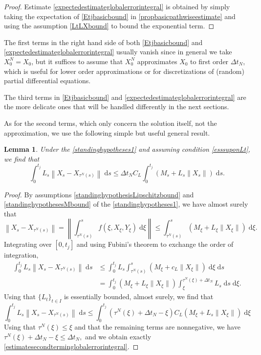 \documentclass[reqno,12pt]{amsart}
\theoremstyle{plain} %
\newtheorem{lemma}{Lemma}[section]
\theoremstyle{definition} %
\begin{document}
\begin{proof}
    Estimate \eqref{expectedestimateglobalerrorintegral} is obtained by simply taking the expectation of \eqref{Etjbasicbound} in \cref{propbasicpathwiseestimate} and using the assumption \eqref{LtLXbound} to bound the exponential term.
\end{proof}


The first terms in the right hand side of both \eqref{Etjbasicbound} and \eqref{expectedestimateglobalerrorintegral} usually vanish since in general we take $X_0^N = X_0$, but it suffices to assume that $X_0^N$ approximates $X_0$ to first order $\Delta t_N$, which is useful for lower order approximations or for discretizations of (random) partial differential equations.

The third terms in \eqref{Etjbasicbound} and \eqref{expectedestimateglobalerrorintegral} are the more delicate ones that will be handled differently in the next sections.

As for the second terms, which only concern the solution itself, not the approximation, we use the following simple but useful general result.

\begin{lemma}
    \label{lemestimatesecondterminglobalerror}
    Under the \cref{standinghypotheses1} and assuming condition \eqref{esssuponLt}, we find that
    \begin{equation}
        \label{estimatesecondterminglobalerrorintegral}
        \int_0^{t_j}L_s\left\|X_s - X_{\tau^N(s)}\right\| \;\mathrm{d}s \leq \Delta t_N C_L \int_0^{t_j} (M_s + L_s\|X_s\|) \;\mathrm{d}s.
    \end{equation}
\end{lemma}

\begin{proof}
    By assumptions \eqref{standinghypothesisLipschitzbound} and \eqref{standinghypothesesMbound} of the \cref{standinghypotheses1}, we have almost surely that
    \[
      \left\|X_s - X_{\tau^N(s)}\right\| = \left\|\int_{\tau^N(s)}^s f(\xi, X_\xi, Y_\xi)\;\mathrm{d}\xi\right\| \leq \int_{\tau^N(s)}^s (M_\xi + L_\xi\|X_\xi\|)\;\mathrm{d}\xi.
    \]
    Integrating over $[0, t_j]$ and using Fubini's theorem to exchange the order of integration,
    \begin{align*}
        \int_0^{t_j}L_s\left\|X_s - X_{\tau^N(s)}\right\| \;\mathrm{d}s & \leq \int_0^{t_j}L_s\int_{\tau^N(s)}^s (M_\xi + c_L\|X_\xi\|) \;\mathrm{d}\xi \;\mathrm{d}s \\
        & = \int_0^{t_j}(M_\xi + L_\xi\|X_\xi\|) \int_\xi^{\tau^N(\xi) + \Delta t_N} L_s\;\mathrm{d}s \;\mathrm{d}\xi.
    \end{align*}
    Using that $\{L_t\}_{t\in I}$ is essentially bounded, almost surely, we find that
    \[
        \int_0^{t_j}L_s\left\|X_s - X_{\tau^N(s)}\right\| \;\mathrm{d}s \leq \int_0^{t_j} (\tau^N(\xi) + \Delta t_N - \xi) C_L(M_\xi + L_s\|X_\xi\|) \;\mathrm{d}\xi
    \]
    Using that $\tau^N(\xi) \leq \xi$ and that the remaining terms are nonnegative, we have $\tau^N(\xi) + \Delta t_N - \xi \leq \Delta t_N,$ and we obtain exactly \eqref{estimatesecondterminglobalerrorintegral}.
\end{proof}
\end{document}
